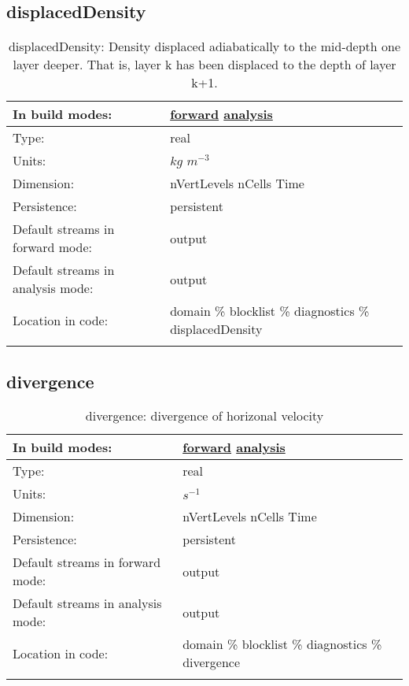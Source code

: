 \subsection[displacedDensity]{displacedDensity}
\label{subsec:var_sec_diagnostics_displacedDensity}
\begin{center}
\begin{longtable}{| p{2.0in} | p{4.0in} |}
        \hline 
        In build modes: & \hyperref[subsec:forward_var_tab_diagnostics]{forward} \hyperref[subsec:analysis_var_tab_diagnostics]{analysis} \\
        \hline 
        Type: & real \\
        \hline 
        Units: & $kg$ $m^{-3}$ \\
        \hline 
        Dimension: & nVertLevels nCells Time \\
        \hline 
        Persistence: & persistent \\
        \hline 
		 Default streams in forward mode: &  output \\
        \hline 
		 Default streams in analysis mode: &  output \\
        \hline 
		 Location in code: & domain \% blocklist \% diagnostics \% displacedDensity \\
		 \hline 
    \caption{displacedDensity: Density displaced adiabatically to the mid-depth one layer deeper.  That is, layer k has been displaced to the depth of layer k+1.}
\end{longtable}
\end{center}
\subsection[divergence]{divergence}
\label{subsec:var_sec_diagnostics_divergence}
\begin{center}
\begin{longtable}{| p{2.0in} | p{4.0in} |}
        \hline 
        In build modes: & \hyperref[subsec:forward_var_tab_diagnostics]{forward} \hyperref[subsec:analysis_var_tab_diagnostics]{analysis} \\
        \hline 
        Type: & real \\
        \hline 
        Units: & $s^{-1}$ \\
        \hline 
        Dimension: & nVertLevels nCells Time \\
        \hline 
        Persistence: & persistent \\
        \hline 
		 Default streams in forward mode: &  output \\
        \hline 
		 Default streams in analysis mode: &  output \\
        \hline 
		 Location in code: & domain \% blocklist \% diagnostics \% divergence \\
		 \hline 
    \caption{divergence: divergence of horizonal velocity}
\end{longtable}
\end{center}
